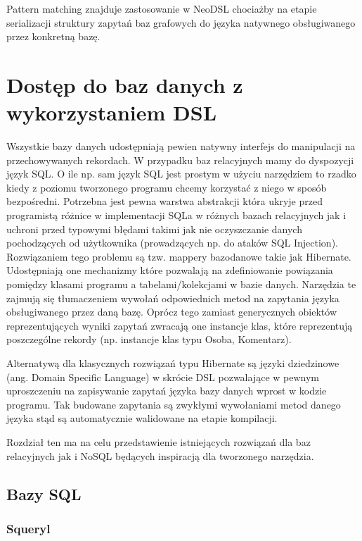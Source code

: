 \documentclass[brudnopis]{xmgr}
\begin{document}
\inputminted{scala}{listings/scala/pattern-matching-trees.scala}

Pattern matching znajduje zastosowanie w NeoDSL chociażby na etapie serializacji struktury zapytań baz grafowych do języka natywnego obsługiwanego przez konkretną bazę.

\chapter{Dostęp do baz danych z wykorzystaniem DSL}

Wszystkie bazy danych udostępniają pewien natywny interfejs do manipulacji na przechowywanych rekordach. W przypadku baz relacyjnych mamy do dyspozycji język SQL. O ile np. sam język SQL jest prostym w użyciu narzędziem to rzadko kiedy z poziomu tworzonego programu chcemy korzystać z niego w sposób bezpośredni. Potrzebna jest pewna warstwa abstrakcji która ukryje przed programistą różnice w implementacji SQLa w różnych bazach relacyjnych jak i uchroni przed typowymi błędami takimi jak nie oczyszczanie danych pochodzących od użytkownika (prowadzących np. do ataków SQL Injection). Rozwiązaniem tego problemu są tzw. mappery bazodanowe takie jak Hibernate. Udostępniają one mechanizmy które pozwalają na zdefiniowanie powiązania pomiędzy klasami programu a tabelami/kolekcjami w bazie danych. Narzędzia te zajmują się tłumaczeniem wywołań odpowiednich metod na zapytania języka obsługiwanego przez daną bazę. Oprócz tego zamiast generycznych obiektów reprezentujących wyniki zapytań zwracają one instancje klas, które reprezentują poszczególne rekordy (np. instancje klas typu Osoba, Komentarz).

Alternatywą dla klasycznych rozwiązań typu Hibernate są języki dziedzinowe (ang. Domain Specific Language) w skrócie DSL pozwalające w pewnym uproszczeniu na zapisywanie zapytań języka bazy danych wprost w kodzie programu. Tak budowane zapytania są zwykłymi wywołaniami metod danego języka stąd są automatycznie walidowane na etapie kompilacji.

Rozdział ten ma na celu przedstawienie istniejących rozwiązań dla baz relacyjnych jak i NoSQL będących inspiracją dla tworzonego narzędzia.

\section{Bazy SQL}

\subsection{Squeryl}
\end{document}
